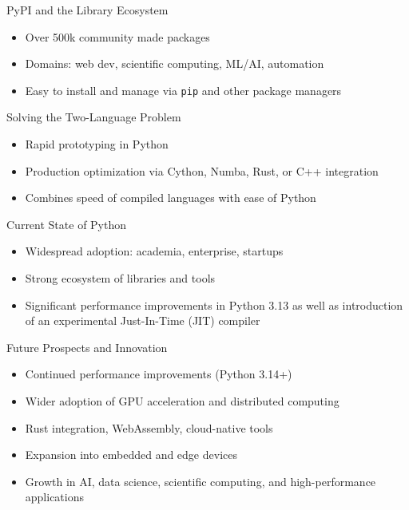 \documentclass[12pt, aspectratio=169]{beamer}
\begin{document}
    \begin{frame}{PyPI and the Library Ecosystem}
        \begin{itemize}
            \item Over 500k community made packages
            \item Domains: web dev, scientific computing, ML/AI, automation
            \item Easy to install and manage via \texttt{pip} and other package managers
        \end{itemize}
    \end{frame}


    \begin{frame}{Solving the Two-Language Problem}
        \begin{itemize}
            \item Rapid prototyping in Python
            \item Production optimization via Cython, Numba, Rust, or C++ integration
            \item Combines speed of compiled languages with ease of Python
        \end{itemize}
    \end{frame}


    \begin{frame}{Current State of Python}
        \begin{itemize}
            \item Widespread adoption: academia, enterprise, startups
            \item Strong ecosystem of libraries and tools
            \item Significant performance improvements in Python 3.13 as well as introduction of an experimental Just-In-Time (JIT) compiler
        \end{itemize}
    \end{frame}


    \begin{frame}{Future Prospects and Innovation}
        \begin{itemize}
            \item Continued performance improvements (Python 3.14+)
            \item Wider adoption of GPU acceleration and distributed computing
            \item Rust integration, WebAssembly, cloud-native tools
            \item Expansion into embedded and edge devices
            \item Growth in AI, data science, scientific computing, and high-performance applications
        \end{itemize}
    \end{frame}
\end{document}
